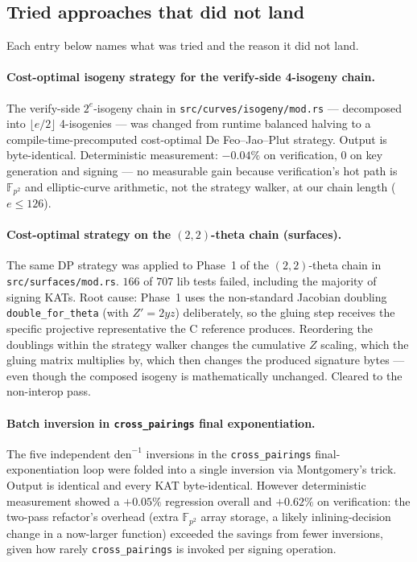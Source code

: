 \subsection{Tried approaches that did not land}
\label{sec:tried-rejected}

Each entry below names what was tried and the reason it did not
land.

\paragraph{Cost-optimal isogeny strategy for the verify-side 4-isogeny
chain.}
The verify-side $2^e$-isogeny chain in
\texttt{src/curves/isogeny/mod.rs} --- decomposed into
$\lfloor e/2 \rfloor$ 4-isogenies --- was changed from runtime
balanced halving to a compile-time-precomputed cost-optimal De
Feo--Jao--Plut strategy.  Output is byte-identical.
Deterministic measurement:
$-0.04\%$ on verification, $0$ on key generation and
signing --- no measurable gain because verification's hot path
is $\mathbb{F}_{p^2}$ and elliptic-curve arithmetic, not the strategy
walker, at our chain length ($e \leq 126$).

\paragraph{Cost-optimal strategy on the $(2,2)$-theta chain (surfaces).}
The same DP strategy was applied to Phase~1 of the $(2,2)$-theta chain
in \texttt{src/surfaces/mod.rs}.  $166$ of $707$ lib tests failed,
including the majority of signing KATs.  Root cause: Phase~1 uses the
non-standard Jacobian doubling \texttt{double\_for\_theta} (with
$Z' = 2yz$) deliberately, so the gluing step receives the specific
projective representative the C reference produces.  Reordering the
doublings within the strategy walker changes the cumulative $Z$
scaling, which the gluing matrix multiplies by, which then changes the
produced signature bytes --- even though the composed isogeny is
mathematically unchanged.  Cleared to the non-interop pass.

\paragraph{Batch inversion in \texttt{cross\_pairings} final
exponentiation.}
The five independent $\mathrm{den}^{-1}$ inversions in the
\texttt{cross\_pairings} final-exponentiation loop were folded into a
single inversion via Montgomery's trick.  Output is identical and
every KAT byte-identical.  However deterministic measurement showed
a $+0.05\%$ regression overall and $+0.62\%$ on verification: the
two-pass refactor's overhead
(extra $\mathbb{F}_{p^2}$ array storage, a likely inlining-decision
change in a now-larger function) exceeded the savings from fewer
inversions, given how rarely \texttt{cross\_pairings} is invoked per
signing operation.

